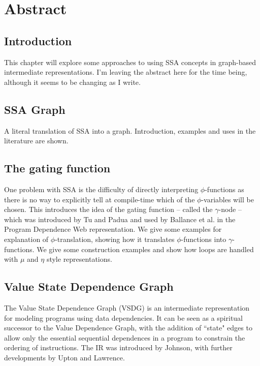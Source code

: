 

\section*{Abstract}

\subsection*{Introduction}

This chapter will explore some approaches to using SSA concepts in graph-based intermediate representations. I'm leaving the abstract here for the time being, although it seems to be changing as I write.

\subsection*{SSA Graph}

A literal translation of SSA into a graph. Introduction, examples and uses in the literature are shown.

\subsection*{The gating function}

One problem with SSA is the difficulty of directly interpreting $\phi$-functions as there is no way to explicitly tell at compile-time which of the $\phi$-variables will be chosen. This introduces the idea of the gating function -- called the $\gamma$-node -- which was introduced by Tu and Padua \cite{207115} and used by Ballance et al. in the Program Dependence Web\cite{93578} representation. We give some examples for explanation of $\phi$-translation, showing how it translates $\phi$-functions into $\gamma$-functions.
We give some construction examples and show how loops are handled with $\mu$ and $\eta$ style representations.

\subsection*{Value State Dependence Graph}

The Value State Dependence Graph (VSDG) is an intermediate representation for modeling programs using data dependencies. It can be seen as a spiritual successor to the Value Dependence Graph\cite{177907}, with the addition of ``state" edges to allow only the essential sequential dependences in a program to constrain the ordering of instructions. The IR was introduced by Johnson\cite{UCAM-CL-TR-607}, with further developments by Upton\cite{upton} and Lawrence\cite{UCAM-CL-TR-705}.


